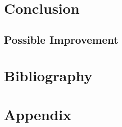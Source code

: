 \documentclass[11pt,a4paper]{article}
\begin{document}
    \section{Conclusion}

    \subsection{Possible Improvement}

    \newpage
    \section{Bibliography}
    \nocite{simple_xgb, detailed_eda}
    
    

    \newpage
    \section{Appendix}
\end{document}
